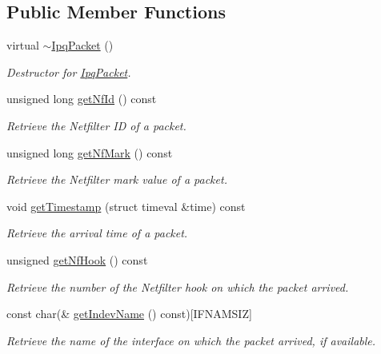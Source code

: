 \subsection*{\-Public \-Member \-Functions}
\begin{DoxyCompactItemize}
\item 
virtual \hyperlink{classIPQ_1_1IpqPacket_a2a0b25202791e9a0773b651b0c589626}{$\sim$\-Ipq\-Packet} ()
\begin{DoxyCompactList}\small\item\em \-Destructor for \hyperlink{classIPQ_1_1IpqPacket}{\-Ipq\-Packet}. \end{DoxyCompactList}\item 
unsigned long \hyperlink{classIPQ_1_1IpqPacket_ac3cbbe2b61e12730ffe231fa19c96e5a}{get\-Nf\-Id} () const 
\begin{DoxyCompactList}\small\item\em \-Retrieve the \-Netfilter \-I\-D of a packet. \end{DoxyCompactList}\item 
unsigned long \hyperlink{classIPQ_1_1IpqPacket_ab97f0a4348e53cb69ed1da74e422dc78}{get\-Nf\-Mark} () const 
\begin{DoxyCompactList}\small\item\em \-Retrieve the \-Netfilter mark value of a packet. \end{DoxyCompactList}\item 
void \hyperlink{classIPQ_1_1IpqPacket_a430ce4f89e651724efdf56c9c1b1647e}{get\-Timestamp} (struct timeval \&time) const 
\begin{DoxyCompactList}\small\item\em \-Retrieve the arrival time of a packet. \end{DoxyCompactList}\item 
unsigned \hyperlink{classIPQ_1_1IpqPacket_ae13884fedce165702f4b71e0e4d93c0b}{get\-Nf\-Hook} () const 
\begin{DoxyCompactList}\small\item\em \-Retrieve the number of the \-Netfilter hook on which the packet arrived. \end{DoxyCompactList}\item 
const char(\& \hyperlink{classIPQ_1_1IpqPacket_a4cf04ca5da28410f27d87edefd679532}{get\-Indev\-Name} () const)\mbox{[}\-I\-F\-N\-A\-M\-S\-I\-Z\mbox{]}
\begin{DoxyCompactList}\small\item\em \-Retrieve the name of the interface on which the packet arrived, if available. \end{DoxyCompactList}\item 

\end{DoxyCompactItemize}
